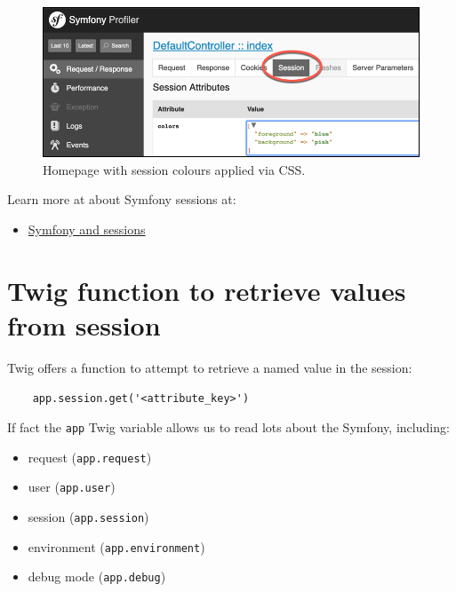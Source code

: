 \documentclass[a4paperpaper,openright]{book}
\providecommand{\tightlist}{%
  \setlength{\itemsep}{0pt}\setlength{\parskip}{0pt}}
\begin{document}
\begin{figure}
\centering
\includegraphics{./tex2pdf.-d01fd108a306454d/b55c386213380dcd9a550b90e2383b0bc3e55ffa.png}
\caption{Homepage with session colours applied via CSS.
\label{session_profiler}}
\end{figure}

Learn more at about Symfony sessions at:

\begin{itemize}
\tightlist
\item
  \href{http://symfony.com/doc/current/components/http_foundation/sessions.html}{Symfony
  and sessions}
\end{itemize}

\hypertarget{twig-function-to-retrieve-values-from-session}{%
\section{Twig function to retrieve values from
session}\label{twig-function-to-retrieve-values-from-session}}

Twig offers a function to attempt to retrieve a named value in the
session:

\begin{verbatim}
    app.session.get('<attribute_key>')
\end{verbatim}

If fact the \texttt{app} Twig variable allows us to read lots about the
Symfony, including:

\begin{itemize}
\item
  request (\texttt{app.request})
\item
  user (\texttt{app.user})
\item
  session (\texttt{app.session})
\item
  environment (\texttt{app.environment})
\item
  debug mode (\texttt{app.debug})
\end{itemize}
\end{document}
